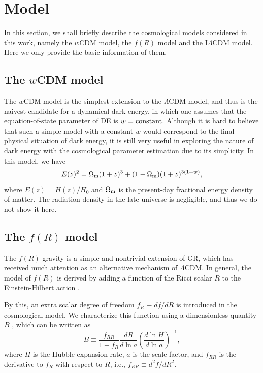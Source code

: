 \documentclass[aps,prd,nofootinbib,amsmath,amssymb,twocolumn,superscriptaddress,10pt]{revtex4}%
\begin{document}
\section{Model}\label{model}

In this section, we shall briefly describe the cosmological models considered in this work, namely the $w$CDM model, the $f(R)$ model and the I$\Lambda$CDM model. 
Here we only provide the basic information of them.


\subsection{The $w$CDM model}

The $w$CDM model is the simplest extension to the $\Lambda$CDM model, and thus is the {naivest candidate for a dynamical dark energy}, in which {one assumes that the equation-of-state parameter of DE is $w=\rm constant$}. Although it is hard to believe that such a simple model with a constant $w$ would correspond to {the final physical situation of} dark energy, it is still very useful in exploring the nature of dark energy with the cosmological parameter estimation due to its simplicity. In this model, we have
\begin{equation}\label{equation}
  E(z)^{2}=\Omega_{\rm m}(1+z)^{3}+(1-\Omega_{\rm m})(1+z)^{3(1+w)},
\end{equation}
where $E(z)=H(z)/H_{0}$ and $\Omega_{\rm m}$ is the present-day fractional energy density of matter. The radiation density in the late universe is negligible, and thus we do not show it here.


\subsection{The $f(R)$ model}

The $f(R)$ gravity is a simple and nontrivial extension of GR, which has received much attention as an alternative mechanism of $\Lambda$CDM.
In general, the model of $f(R)$ is derived by adding a function of the Ricci scalar $R$ to the Einstein-Hilbert action \cite{Carroll:2003wy}. 

By this, an extra scalar degree of freedom $f_{R}\equiv df/dR$ is introduced in the cosmological model. We characterize this function using a dimensionless quantity $B$ \cite{Song:2006ej}, which can be written as
\begin{equation}\label{quantity}
  B\equiv \frac{f_{RR}}{1+f_{R}}\frac{dR}{d\ln a}(\frac{d \ln H}{d \ln a})^{-1},
\end{equation}
where $H$ is the Hubble expansion rate, $a$ is the scale factor, and $f_{RR}$ is the derivative to $f_{R}$ with respect to $R$, i.e., $f_{RR}\equiv d^{2}f/d R^{2}$.
\end{document}
